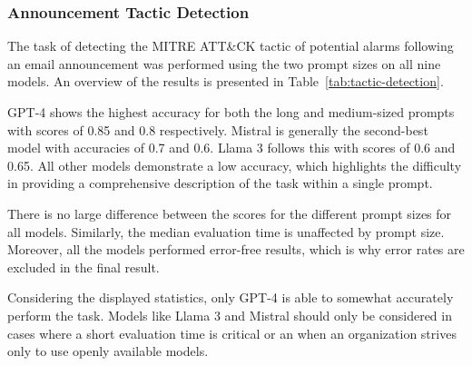 \subsubsection{Announcement Tactic Detection}

The task of detecting the MITRE ATT\&CK tactic of potential alarms following an email announcement was performed using
the two prompt sizes on all nine models.
An overview of the results is presented in Table\ \ref{tab:tactic-detection}.



GPT-4 shows the highest accuracy for both the long and medium-sized prompts with scores of 0.85 and 0.8 respectively.
Mistral is generally the second-best model with accuracies of 0.7 and 0.6.
Llama 3 follows this with scores of 0.6 and 0.65.
All other models demonstrate a low accuracy, which highlights the difficulty in providing a comprehensive description
of the task within a single prompt.

There is no large difference between the scores for the different prompt sizes for all models.
Similarly, the median evaluation time is unaffected by prompt size.
Moreover, all the models performed error-free results, which is why error rates are excluded in the final result.

Considering the displayed statistics, only GPT-4 is able to somewhat accurately perform the task.
Models like Llama 3 and Mistral should only be considered in cases where a short evaluation time is critical or an when
an organization strives only to use openly available models.